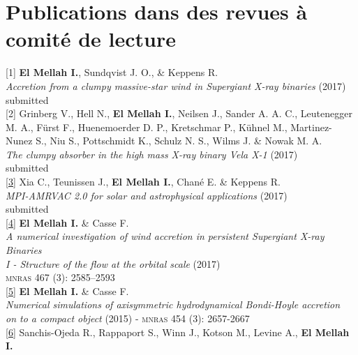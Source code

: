 \documentclass[a4paper,oneside]{article}
\begin{document}
\section*{Publications dans des revues à comité de lecture}

\begin{flushleft}

[1] \textbf{El Mellah I.}, Sundqvist J. O., \& Keppens R. \\ 
\emph{Accretion from a clumpy massive-star wind in Supergiant X-ray binaries} (2017) \\
submitted\\
\vspace*{0.3cm}
[2] Grinberg V., Hell N., \textbf{El Mellah I.}, Neilsen J., Sander A. A. C., Leutenegger M. A., Fürst F., Huenemoerder D. P., Kretschmar P., Kühnel M., Martinez-Nunez S., Niu S., Pottschmidt K., Schulz N. S., Wilms J. \& Nowak M. A.\\ 
\emph{The clumpy absorber in the high mass X-ray binary Vela X-1} (2017) \\
submitted\\
\vspace*{0.3cm}
\href{https://arxiv.org/abs/1710.06140}{[3]} Xia C., Teunissen J., \textbf{El Mellah I.}, Chané E. \& Keppens R. \\ 
\emph{MPI-AMRVAC 2.0 for solar and astrophysical applications} (2017) \\
submitted\\
\vspace*{0.3cm}
\href{https://academic.oup.com/mnras/article/467/3/2585/2961795/A-numerical-investigation-of-wind-accretion-in}{[4]} \textbf{El Mellah I.} \& Casse F. \\ 
\emph{A numerical investigation of wind accretion in persistent Supergiant X-ray Binaries}\\
\emph{I - Structure of the flow at the orbital scale} (2017)\\
\textsc{mnras} 467 (3): 2585–2593\\
\vspace*{0.3cm}
\href{https://academic.oup.com/mnras/article-lookup/doi/10.1093/mnras/stv2184}{[5]} \textbf{El Mellah I.} \& Casse F. \\ 
\emph{Numerical simulations of axisymmetric hydrodynamical Bondi-Hoyle accretion}\\
\emph{on to a compact object} (2015) - \textsc{mnras} 454 (3): 2657-2667\\
\vspace*{0.3cm}
\href{http://iopscience.iop.org/article/10.1088/0004-637X/787/1/47/meta}{[6]} Sanchis-Ojeda R., Rappaport S., Winn J., Kotson M., Levine A., \textbf{El Mellah I.}\\

\end{flushleft}
\end{document}
